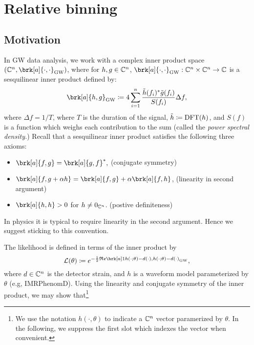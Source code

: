 
\section{Relative binning}
\subsection{Motivation}
In GW data analysis, we work with a complex inner product space $(\com^n, \brk[a]{\cdot,\cdot}_{\text{GW}})$, where for $h,g \in \mathbb{C}^n$, $\brk[a]{\cdot,\cdot}_{\text{GW}}:\com^n \times \com^n \to \com$ is a sesquilinear inner product defined by:
\begin{equation}\label{eq:gw-inner}
\brk[a]{h,g}_{\text{GW}} \defn 4 \sum_{i=1}^n \frac{\tilde{h}(f_i)^* \tilde{g}(f_i)}{S(f_i)} \Delta f,
\end{equation}
where $\Delta f = 1/T$, where $T$ is the duration of the signal, $\tilde{h} \coloneqq \text{DFT}(h)$, and $S(f)$ is a function which weighs each contribution to the sum (called the \textit{power spectral density.})
Recall that a sesquilinear inner product satisfies the following three axioms:
\begin{itemize}
  \item $\brk[a]{f,g} = \brk[a]{g,f}^*,$ \hfill{(conjugate symmetry)}
  \item $\brk[a]{f, g + \alpha h} = \brk[a]{f,g} + \alpha \brk[a]{f,h}$, \hfill{(linearity in second argument)}
  \item $\brk[a]{h,h} > 0$ for $h \neq 0_{\mathbb{C}^n}$. \hfill{(postive definiteness)}
\end{itemize}
\begin{remark}[]\label{}
In physics it is typical to require linearity in the second argument. Hence we suggest sticking to this convention.
\end{remark}
The likelihood is defined in terms of the inner product by
\begin{equation}\label{}
\like(\theta) \defn e^{-\frac{1}{2} \re \brk[a]1{h(\cdot ; \theta) - d(\cdot),h(\cdot ; \theta) - d(\cdot)}_{\text{GW}}},
\end{equation}
where $d \in \mathbb{C}^n$ is the detector strain, and $h$ is a waveform model parameterized by $\theta$ (e.g, IMRPhenomD).
Using the linearity and conjugate symmetry of the inner product, we may show that\footnote{We use the notation $h(\cdot, \theta)$ to indicate a $\mathbb{C}^n$ vector paramerized by $\theta$.
In the following, we suppress the first slot which indexes the vector when convenient.}
